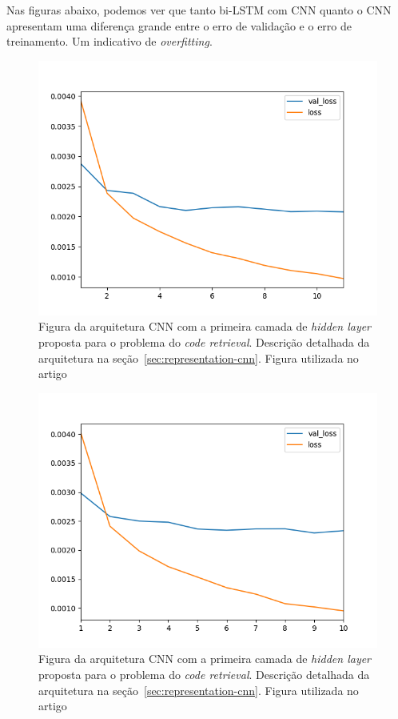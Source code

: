 Nas figuras abaixo, podemos ver que tanto bi-LSTM com CNN quanto o CNN apresentam uma diferença grande entre o erro de validação e o erro de treinamento. Um indicativo de \textit{overfitting}.

\begin{figure}[h]
    \centering
    \includegraphics[width=1\textwidth]{figuras/cap-resultados-preliminares/569229_ConvolutionalLSTM_plot.png}
    \caption{Figura da arquitetura CNN com a primeira camada de \textit{hidden layer} proposta para o problema do \textit{code retrieval}. Descrição detalhada da arquitetura na seção~\ref{sec:representation-cnn}. Figura utilizada no artigo \cite{marcelo-vem-2019}}
    \label{fig:arquitetura-cnn}
\end{figure}

\begin{figure}[h]
    \centering
    \includegraphics[width=1\textwidth]{figuras/cap-resultados-preliminares/569229_ConvolutionModel_plot.png}
    \caption{Figura da arquitetura CNN com a primeira camada de \textit{hidden layer} proposta para o problema do \textit{code retrieval}. Descrição detalhada da arquitetura na seção~\ref{sec:representation-cnn}. Figura utilizada no artigo \cite{marcelo-vem-2019}}
    \label{fig:arquitetura-cnn}
\end{figure}

